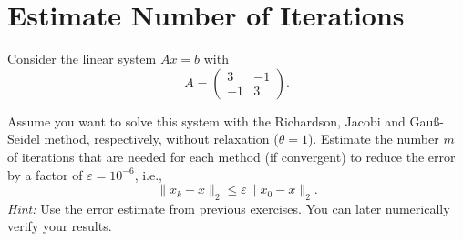 \section{Estimate Number of Iterations}
Consider the linear system $Ax=b$ with
$$A=\begin{pmatrix}
3&-1\\-1&3
\end{pmatrix}.$$

Assume you want to solve this system with the Richardson, Jacobi and Gauß-Seidel method, respectively, without relaxation ($\theta = 1$). Estimate the number $m$ of iterations that are needed for each method (if convergent) to reduce the error by a factor of $\varepsilon=10^{-6}$, i.e.,
	$$\|x_k-x\|_2 \leq \varepsilon\|x_0-x\|_2.$$
	\textit{Hint: }Use the error estimate from previous exercises. You can later numerically verify your results.
